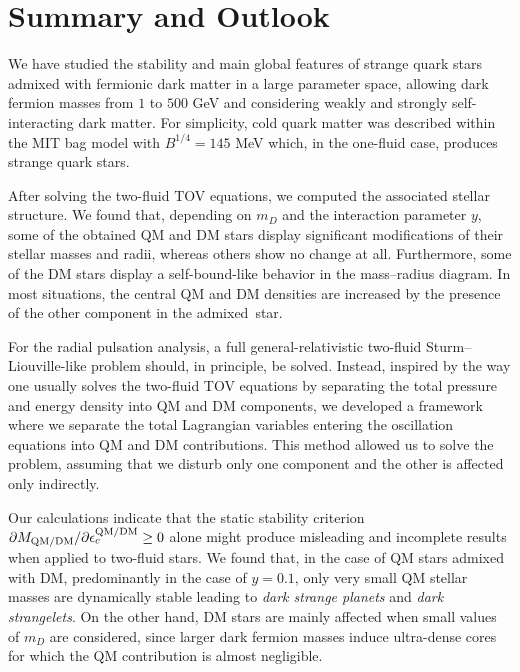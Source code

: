 \documentclass[universe,article,accept,moreauthors,pdftex]{Definitions/mdpi}
\begin{document}
\section{Summary and Outlook}
  \label{sec:conclusion}

We have studied the stability and main global features of strange quark stars admixed with fermionic dark matter in a large parameter space, allowing dark fermion masses from $1$ to $500$ GeV and considering weakly and strongly self-interacting dark matter. For simplicity, cold quark matter was described within the MIT bag model with $B^{1/4}=145$ MeV which, in the one-fluid case, produces strange quark stars.

After solving the two-fluid TOV equations, we computed the associated stellar structure. We found that, depending on $m_{D}$ and the interaction parameter $y$, some of the obtained QM and DM stars display significant modifications of their stellar masses and radii, whereas others show no change at all. Furthermore, some of the DM stars display a self-bound-like behavior in the mass--radius diagram. In most situations, the central QM and DM densities are increased by the presence of the other component in the admixed~star.
  
For the radial pulsation analysis, a full general-relativistic two-fluid Sturm--Liouville-like problem should, in principle, be solved. Instead, inspired by the way one usually solves the two-fluid TOV equations by separating the total pressure and energy density into QM and DM components, we developed a framework where we separate the total Lagrangian variables entering the oscillation equations into QM and DM contributions. This method allowed us to solve the problem, assuming that we disturb only one component and the other is affected only indirectly.

Our calculations indicate that the static stability criterion $\partial{M}_{\rm QM/DM}/\partial{\epsilon^{\rm QM/DM}_{c}}\geq0$ alone might produce misleading and incomplete results when applied to two-fluid stars. We found that, in the case of QM stars admixed with DM, predominantly in the case of $y=0.1$, only very small QM stellar masses are dynamically stable leading to {\it dark strange planets} and {\it dark strangelets}. On the other hand, DM stars are mainly affected when small values of $m_{D}$ are considered, since larger dark fermion masses induce ultra-dense cores for which the QM contribution is almost negligible. 
\end{document}
